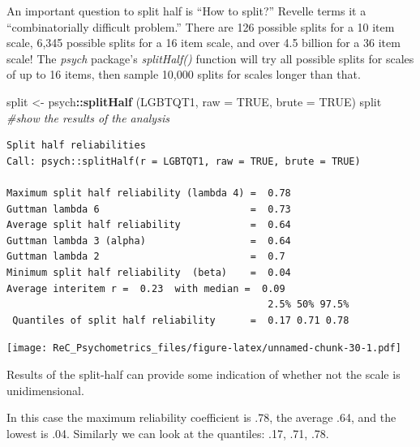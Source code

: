 \documentclass[
  english,
]{book}
\newenvironment{Shaded}{\begin{snugshade}}{\end{snugshade}}
\newcommand{\CommentTok}[1]{\textcolor[rgb]{0.56,0.35,0.01}{\textit{#1}}}
\newcommand{\DataTypeTok}[1]{\textcolor[rgb]{0.13,0.29,0.53}{#1}}
\newcommand{\DecValTok}[1]{\textcolor[rgb]{0.00,0.00,0.81}{#1}}
\newcommand{\KeywordTok}[1]{\textcolor[rgb]{0.13,0.29,0.53}{\textbf{#1}}}
\newcommand{\NormalTok}[1]{#1}
\newcommand{\OperatorTok}[1]{\textcolor[rgb]{0.81,0.36,0.00}{\textbf{#1}}}
\newcommand{\OtherTok}[1]{\textcolor[rgb]{0.56,0.35,0.01}{#1}}
\newcommand{\StringTok}[1]{\textcolor[rgb]{0.31,0.60,0.02}{#1}}
\begin{document}
An important question to split half is ``How to split?'' Revelle terms it a ``combinatorially difficult problem.'' There are 126 possible splits for a 10 item scale, 6,345 possible splits for a 16 item scale, and over 4.5 billion for a 36 item scale! The \emph{psych} package's \emph{splitHalf()} function will try all possible splits for scales of up to 16 items, then sample 10,000 splits for scales longer than that.

\begin{Shaded}
\begin{Highlighting}[]
\NormalTok{split <-}\StringTok{ }\NormalTok{psych}\OperatorTok{::}\KeywordTok{splitHalf}\NormalTok{ (LGBTQT1, }\DataTypeTok{raw =} \OtherTok{TRUE}\NormalTok{, }\DataTypeTok{brute =} \OtherTok{TRUE}\NormalTok{)}
\NormalTok{split }\CommentTok{#show the results of the analysis}
\end{Highlighting}
\end{Shaded}

\begin{verbatim}
Split half reliabilities  
Call: psych::splitHalf(r = LGBTQT1, raw = TRUE, brute = TRUE)

Maximum split half reliability (lambda 4) =  0.78
Guttman lambda 6                          =  0.73
Average split half reliability            =  0.64
Guttman lambda 3 (alpha)                  =  0.64
Guttman lambda 2                          =  0.7
Minimum split half reliability  (beta)    =  0.04
Average interitem r =  0.23  with median =  0.09
                                             2.5% 50% 97.5%
 Quantiles of split half reliability      =  0.17 0.71 0.78
\end{verbatim}

\begin{Shaded}
\end{Shaded}

\texttt{[image: ReC\_Psychometrics\_files/figure-latex/unnamed-chunk-30-1.pdf]}

Results of the split-half can provide some indication of whether not the scale is unidimensional.

In this case the maximum reliability coefficient is .78, the average .64, and the lowest is .04. Similarly we can look at the quantiles: .17, .71, .78.
\end{document}
